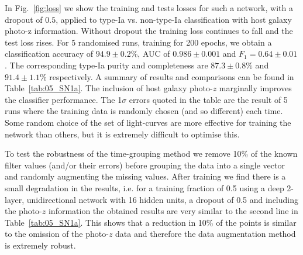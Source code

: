 \documentclass[twocolumn]{aastex61}
\begin{document}
In Fig.~\ref{fig:loss} we show the training and tests losses for such a network, with a dropout of $0.5$, applied to type-Ia vs. non-type-Ia classification with host galaxy photo-z information. Without dropout the training loss continues to fall and the test loss rises. For 5 randomised runs, training for 200 epochs, we obtain a classification accuracy of $94.9 \pm 0.2$\%, AUC of $0.986 \pm 0.001$ and $F_1 = 0.64 \pm 0.01$. The corresponding type-Ia purity and completeness are $87.3 \pm 0.8\%$ and $91.4\pm 1.1\%$ respectively. A summary of results and comparisons can be found in Table~\ref{tab:05_SN1a}. The inclusion of host galaxy photo-$z$ marginally improves the classifier performance. The 1$\sigma$ errors quoted in the table are the result of 5 runs where the training data is randomly chosen (and so different) each time. Some random choice of the set of light-curves are more effective for training the network than others, but it is extremely difficult to optimise this.

To test the robustness of the time-grouping method we remove 10\% of the known filter values (and/or their errors) before grouping the data into a single vector and randomly augmenting the missing values. After training we find there is a small degradation in the results, i.e. for a training fraction of 0.5 using a deep 2-layer, unidirectional network with 16 hidden units, a dropout of 0.5 and including the photo-$z$ information the obtained results are very similar to the second line in Table~\ref{tab:05_SN1a}. This shows that a reduction in 10\% of the points is similar to the omission of the photo-$z$ data and therefore the data augmentation method is extremely robust.
\end{document}
